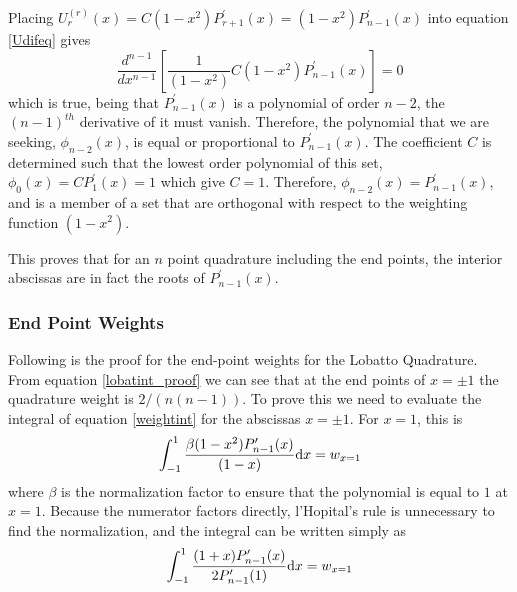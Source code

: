 Placing $U_r^{(r)}(x)=C(1-x^2)P_{r+1}^\prime(x)=(1-x^2)P_{n-1}^\prime(x)$ into 
equation \ref{Udifeq} gives
\begin{equation}
\frac{d^{n-1}}{dx^{n-1}}\left[ \frac{1}{(1-x^2)}C(1-x^2)P_{n-1}^\prime(x) \right]=0
\end{equation}
which is true, being that $P_{n-1}^\prime(x)$ is a polynomial of order $n-2$, 
the $(n-1)^{th}$ derivative of it must vanish. Therefore, the polynomial that
we are seeking, $\phi_{n-2}(x)$, is equal or proportional to $P_{n-1}^\prime(x)$. 
The coefficient $C$ is determined such that the lowest order
polynomial of this set, $\phi_0(x)=CP_1^\prime(x)=1$ which give $C=1$. 
Therefore, $\phi_{n-2}(x)=P_{n-1}^\prime(x)$, and  is a member of a set that are 
orthogonal with respect to the weighting function $(1-x^2)$. 

This proves that for an $n$ point quadrature including the end points, the interior
abscissas are in fact the roots of $P_{n-1}^\prime(x)$. 

\subsubsection{End Point Weights}
Following is the proof for the end-point weights for the Lobatto Quadrature. From 
equation \ref{lobatint_proof} we can see that at the end points of $x=\pm 1$ the 
quadrature weight is $2/(n(n-1))$. To prove this we need to evaluate the integral of 
equation \ref{weightint} for the abscissas $x=\pm1$. For $x=1$, this is
\begin{equation}
\label{w_xp_1}
\int_{-1}^{1} \frac{\beta(1-x^2)P^\prime_{n-1}(x)}{(1-x)}{\rm d}x = w_{x=1}
\end{equation}
where $\beta$ is the normalization factor to ensure that the polynomial is equal 
to $1$ at $x=1$. Because the numerator factors directly, l'Hopital's rule is unnecessary
to find the normalization, and the integral can be written simply as
\begin{equation}
\label{w_xp_2}
\int_{-1}^{1} \frac{(1+x)P^\prime_{n-1}(x)}{2P^\prime_{n-1}(1)}{\rm d}x = w_{x=1}
\end{equation}

